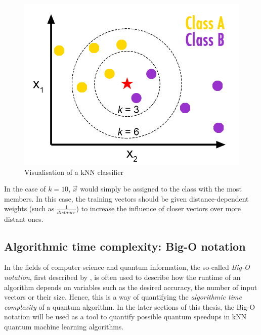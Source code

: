 \begin{figure}[H]
      \centering
       \includegraphics[scale=0.8]{img/knn-concept.png}
       \caption[]{\label{fig:knnconcept} Visualisation of a kNN classifier\footnotemark[4]}
\end{figure}


In the case of $k = 10$, $\vec{x}$ would simply be assigned to the class with the most members. In this case, the training vectors should be given distance-dependent weights (such as $\frac{1}{distance}$) to increase the influence of closer vectors over more distant ones.

\subsection{Algorithmic time complexity: Big-O notation}
\label{subsubsec:algcomplexity}

In the fields of computer science and quantum information, the so-called \emph{Big-O notation}, first described by , is often used to describe how the runtime of an algorithm depends on variables such as the desired accuracy, the number of input vectors or their size. Hence, this is a way of quantifying the \emph{algorithmic time complexity} of a quantum algorithm. In the later sections of this thesis, the Big-O notation will be used as a tool to quantify possible quantum speedups in kNN quantum machine learning algorithms.

